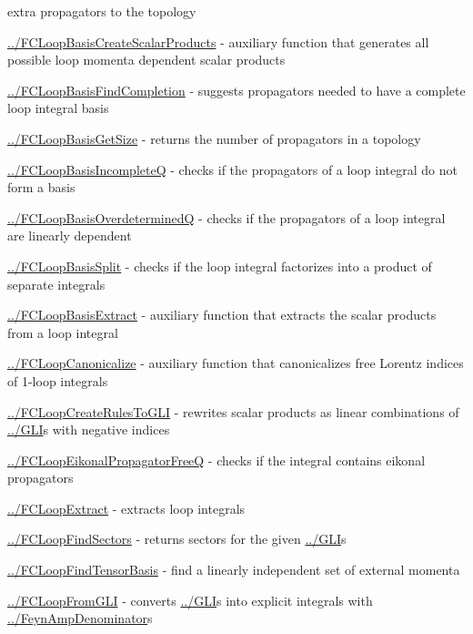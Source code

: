 \documentclass[../FeynCalcManual.tex]{subfiles}
\begin{document}
\begin{itemize}
{  extra propagators to the topology
\item
  \hyperlink{../fcloopbasiscreatescalarproducts}{../FCLoopBasisCreateScalarProducts}
  - auxiliary function that generates all possible loop momenta
  dependent scalar products
\item
  \hyperlink{../fcloopbasisfindcompletion}{../FCLoopBasisFindCompletion}
  - suggests propagators needed to have a complete loop integral basis
\item
  \hyperlink{../fcloopbasisgetsize}{../FCLoopBasisGetSize} - returns the
  number of propagators in a topology
\item
  \hyperlink{../fcloopbasisincompleteq}{../FCLoopBasisIncompleteQ} -
  checks if the propagators of a loop integral do not form a basis
\item
  \hyperlink{../fcloopbasisoverdeterminedq}{../FCLoopBasisOverdeterminedQ}
  - checks if the propagators of a loop integral are linearly dependent
\item
  \hyperlink{../fcloopbasissplit}{../FCLoopBasisSplit} - checks if the
  loop integral factorizes into a product of separate integrals
\item
  \hyperlink{../fcloopbasisextract}{../FCLoopBasisExtract} - auxiliary
  function that extracts the scalar products from a loop integral
\item
  \hyperlink{../fcloopcanonicalize}{../FCLoopCanonicalize} - auxiliary
  function that canonicalizes free Lorentz indices of 1-loop integrals
\item
  \hyperlink{../fcloopcreaterulestogli}{../FCLoopCreateRulesToGLI} -
  rewrites scalar products as linear combinations of
  \hyperlink{../gli}{../GLI}s with negative indices
\item
  \hyperlink{../fcloopeikonalpropagatorfreeq}{../FCLoopEikonalPropagatorFreeQ}
  - checks if the integral contains eikonal propagators
\item
  \hyperlink{../fcloopextract}{../FCLoopExtract} - extracts loop
  integrals
\item
  \hyperlink{../fcloopfindsectors}{../FCLoopFindSectors} - returns
  sectors for the given \hyperlink{../gli}{../GLI}s
\item
  \hyperlink{../fcloopfindtensorbasis}{../FCLoopFindTensorBasis} - find
  a linearly independent set of external momenta
\item
  \hyperlink{../fcloopfromgli}{../FCLoopFromGLI} - converts
  \hyperlink{../gli}{../GLI}s into explicit integrals with
  \hyperlink{../feynampdenominator}{../FeynAmpDenominator}s
}
\end{itemize}
\end{document}
